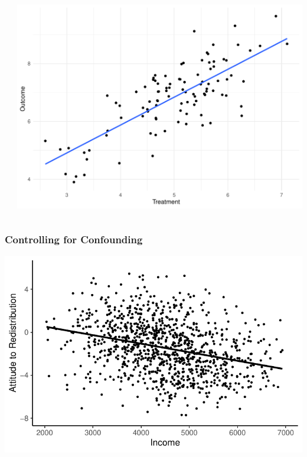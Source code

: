 \documentclass[xcolor=x11names,compress]{beamer}\usepackage[]{graphicx}\usepackage[]{color}
\makeatletter
\def\maxwidth{ %
  \ifdim\Gin@nat@width>\linewidth
    \linewidth
  \else
    \Gin@nat@width
  \fi
}
\newenvironment{knitrout}{}{} %
\renewcommand{\(}{\begin{columns}}
\renewcommand{\)}{\end{columns}}
\newcommand{\<}[1]{\begin{column}{#1}}
\renewcommand{\>}{\end{column}}
\makeatother
\begin{document}
\begin{frame}
\begin{columns}
\begin{column}{0.5\textwidth}
\begin{knitrout}
\end{knitrout}
\end{column}
\begin{column}{0.5\textwidth}
\begin{knitrout}
\color{fgcolor}
\includegraphics[width=\maxwidth]{figure/Dag_graph_eg-1} 

\end{knitrout}
\end{column}
\end{columns}
\end{frame}



\begin{frame}
\frametitle{Controlling for Confounding}
\begin{knitrout}
\color{fgcolor}
\includegraphics[width=\maxwidth]{figure/confound0a-1} 

\end{knitrout}
\end{frame}
\end{document}
